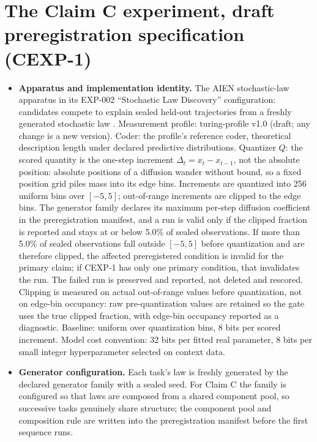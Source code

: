 \documentclass[11pt]{article}
\begin{document}
\section{The Claim C experiment, draft preregistration specification (CEXP-1)}
\label{app:claimC}

\begin{itemize}
\item \textbf{Apparatus and implementation identity.} The AIEN stochastic-law apparatus in its EXP-002 ``Stochastic Law Discovery'' configuration: candidates compete to explain sealed held-out trajectories from a freshly generated stochastic law \cite{stapleton2026a, stapleton2026b}. Measurement profile: turing-profile v1.0 (draft; any change is a new version). Coder: the profile's reference coder, theoretical description length under declared predictive distributions. Quantizer $Q$: the scored quantity is the one-step increment $\Delta_t = x_t - x_{t-1}$, not the absolute position: absolute positions of a diffusion wander without bound, so a fixed position grid piles mass into its edge bins. Increments are quantized into 256 uniform bins over $[-5, 5]$; out-of-range increments are clipped to the edge bins. The generator family declares its maximum per-step diffusion coefficient in the preregistration manifest, and a run is valid only if the clipped fraction is reported and stays at or below 5.0\% of sealed observations. If more than 5.0\% of sealed observations fall outside $[-5,5]$ before quantization and are therefore clipped, the affected preregistered condition is invalid for the primary claim; if CEXP-1 has only one primary condition, that invalidates the run. The failed run is preserved and reported, not deleted and rescored. Clipping is measured on actual out-of-range values before quantization, not on edge-bin occupancy: raw pre-quantization values are retained so the gate uses the true clipped fraction, with edge-bin occupancy reported as a diagnostic. Baseline: uniform over quantization bins, 8 bits per scored increment. Model cost convention: 32 bits per fitted real parameter, 8 bits per small integer hyperparameter selected on context data.
\item \textbf{Generator configuration.} Each task's law is freshly generated by the declared generator family with a sealed seed. For Claim C the family is configured so that laws are composed from a shared component pool, so successive tasks genuinely share structure; the component pool and composition rule are written into the preregistration manifest before the first sequence runs.

\end{itemize}
\end{document}
